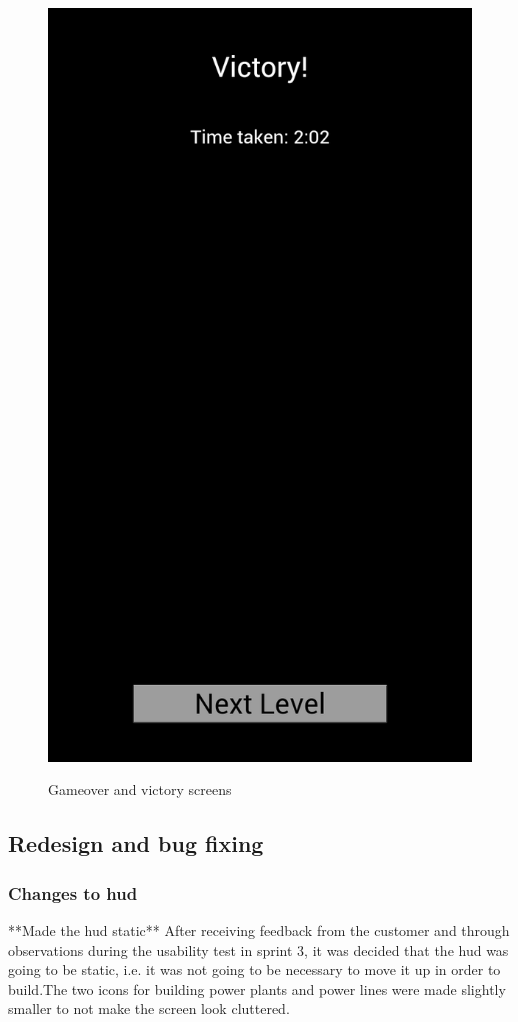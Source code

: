 \begin{figure}[H]
{		\includegraphics[scale=0.18]{pictures/sprint4-screen/victory}
	}
	\caption{Gameover and victory screens}
\end{figure}


\subsection{Redesign and bug fixing}
	
	\subsubsection*{Changes to hud}
		**Made the hud static**
		After receiving feedback from the customer and through observations during the usability test in sprint 3, it was decided that the hud was going to be static, i.e. it was not going to be necessary to move it up in order to build.The two icons for building power plants and power lines were made slightly smaller to not make the screen look cluttered.

